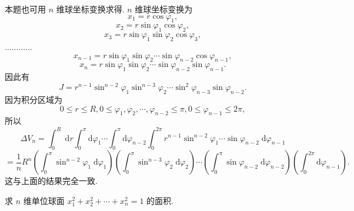 本题也可用 \(n\) 维球坐标变换求得. \(n\) 维球坐标变换为
\[
{x}_{1} = r\cos {\varphi }_{1},
\]
\[
{x}_{2} = r\sin {\varphi }_{1}\cos {\varphi }_{2},
\]
\[
{x}_{3} = r\sin {\varphi }_{1}\sin {\varphi }_{2}\cos {\varphi }_{3},
\]
............
\[
{x}_{n - 1} = r\sin {\varphi }_{1}\sin {\varphi }_{2}\cdots \sin {\varphi }_{n - 2}\cos {\varphi }_{n - 1},
\]
\[
{x}_{n} = r\sin {\varphi }_{1}\sin {\varphi }_{2}\cdots \sin {\varphi }_{n - 2}\sin {\varphi }_{n - 1}.
\]
因此有
\[
J = {r}^{n - 1}{\sin }^{n - 2}{\varphi }_{1}{\sin }^{n - 3}{\varphi }_{2}\cdots {\sin }^{2}{\varphi }_{n - 3}\sin {\varphi }_{n - 2}.
\]
因为积分区域为
\[
0 \leq  r \leq  R,0 \leq  {\varphi }_{1},{\varphi }_{2},\cdots ,{\varphi }_{n - 2} \leq  \pi ,0 \leq  {\varphi }_{n - 1} \leq  {2\pi },
\]
所以
\[
\Delta {V}_{n} = {\int }_{0}^{R}\mathrm{\;d}r{\int }_{0}^{\pi }\mathrm{d}{\varphi }_{1}\cdots {\int }_{0}^{\pi }\mathrm{d}{\varphi }_{n - 2}{\int }_{0}^{2\pi }{r}^{n - 1}{\sin }^{n - 2}{\varphi }_{1}\cdots \sin {\varphi }_{n - 2}\mathrm{\;d}{\varphi }_{n - 1}
\]
\[
= \frac{1}{n}{R}^{n}\left( {{\int }_{0}^{\pi }{\sin }^{n - 2}{\varphi }_{1}\mathrm{\;d}{\varphi }_{1}}\right) \left( {{\int }_{0}^{\pi }{\sin }^{n - 3}{\varphi }_{2}\mathrm{\;d}{\varphi }_{2}}\right) \cdots \left( {{\int }_{0}^{\pi }\sin {\varphi }_{n - 2}\mathrm{\;d}{\varphi }_{n - 2}}\right) \left( {{\int }_{0}^{2\pi }\mathrm{d}{\varphi }_{n - 1}}\right) .
\]
这与上面的结果完全一致.

\begin{example}

\end{example}
求 \(n\) 维单位球面 \({x}_{1}^{2} + {x}_{2}^{2} + \cdots  + {x}_{n}^{2} = 1\) 的面积.

